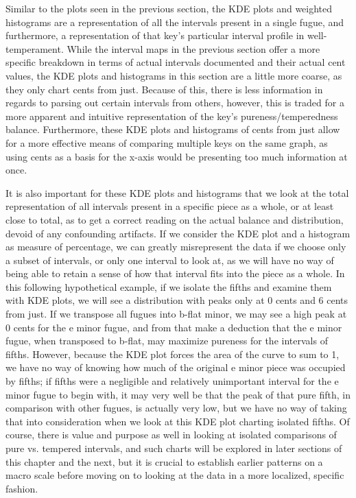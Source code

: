 Similar to the plots seen in the previous section, the KDE plots and
weighted histograms are a representation of all the intervals present in
a single fugue, and furthermore, a representation of that key's
particular interval profile in well-temperament. While the interval maps
in the previous section offer a more specific breakdown in terms of
actual intervals documented and their actual cent values, the KDE plots
and histograms in this section are a little more coarse, as they only
chart cents from just. Because of this, there is less information in
regards to parsing out certain intervals from others, however, this is
traded for a more apparent and intuitive representation of the key's
pureness/temperedness balance. Furthermore, these KDE plots and
histograms of cents from just allow for a more effective means of
comparing multiple keys on the same graph, as using cents as a basis for
the x-axis would be presenting too much information at once.

It is also important for these KDE plots and histograms that we look at
the total representation of all intervals present in a specific piece as
a whole, or at least close to total, as to get a correct reading on the
actual balance and distribution, devoid of any confounding artifacts. If
we consider the KDE plot and a histogram as measure of percentage, we
can greatly misrepresent the data if we choose only a subset of
intervals, or only one interval to look at, as we will have no way of
being able to retain a sense of how that interval fits into the piece as
a whole. In this following hypothetical example, if we isolate the
fifths and examine them with KDE plots, we will see a distribution with
peaks only at 0 cents and 6 cents from just. If we transpose all fugues
into b-flat minor, we may see a high peak at 0 cents for the e minor
fugue, and from that make a deduction that the e minor fugue, when
transposed to b-flat, may maximize pureness for the intervals of fifths.
However, because the KDE plot forces the area of the curve to sum to 1,
we have no way of knowing how much of the original e minor piece was
occupied by fifths; if fifths were a negligible and relatively
unimportant interval for the e minor fugue to begin with, it may very
well be that the peak of that pure fifth, in comparison with other
fugues, is actually very low, but we have no way of taking that into
consideration when we look at this KDE plot charting isolated fifths. Of
course, there is value and purpose as well in looking at isolated
comparisons of pure vs. tempered intervals, and such charts will be
explored in later sections of this chapter and the next, but it is
crucial to establish earlier patterns on a macro scale before moving on
to looking at the data in a more localized, specific fashion.

